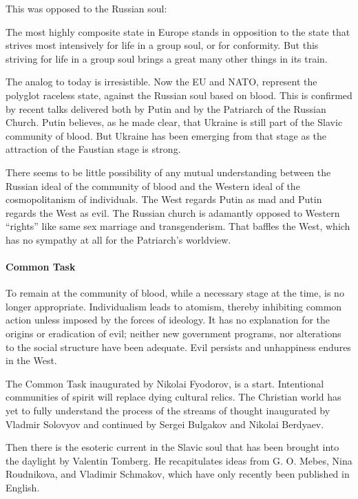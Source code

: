 This was opposed to the Russian soul:

\begin{quotex}
The most highly composite state in Europe stands in opposition to the state that strives most intensively for life in a group soul, or for conformity. But this striving for life in a group soul brings a great many other things in its train.
\end{quotex}


The analog to today is irresistible. Now the EU and NATO, represent the polyglot raceless state, against the Russian soul based on blood. This is confirmed by recent talks delivered both by Putin and by the Patriarch of the Russian Church. Putin believes, as he made clear, that Ukraine is still part of the Slavic community of blood. But Ukraine has been emerging from that stage as the attraction of the Faustian stage is strong.

There seems to be little possibility of any mutual understanding between the Russian ideal of the community of blood and the Western ideal of the cosmopolitanism of individuals. The West regards Putin as mad and Putin regards the West as evil. The Russian church is adamantly opposed to Western ``rights'' like same sex marriage and transgenderism. That baffles the West, which has no sympathy at all for the Patriarch's worldview.

\paragraph{Common Task}


To remain at the community of blood, while a necessary stage at the time, is no longer appropriate. Individualism leads to atomism, thereby inhibiting common action unless imposed by the forces of ideology. It has no explanation for the origins or eradication of evil; neither new government programs, nor alterations to the social structure have been adequate. Evil persists and unhappiness endures in the West.

The Common Task inaugurated by Nikolai Fyodorov, is a start. Intentional communities of spirit will replace dying cultural relics. The Christian world has yet to fully understand the process of the streams of thought inaugurated by Vladmir Solovyov and continued by Sergei Bulgakov and Nikolai Berdyaev.

Then there is the esoteric current in the Slavic soul that has been brought into the daylight by Valentin Tomberg. He recapitulates ideas from G. O. Mebes, Nina Roudnikova, and Vladimir Schmakov, which have only recently been published in English.

